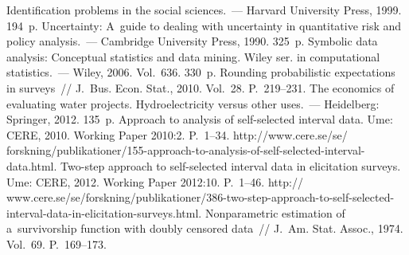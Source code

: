 


\vspace*{-6pt}


 \begin{multicols}{2}

\renewcommand{\bibname}{\protect\rmfamily Литература}

{\small\frenchspacing
{%
\begin{thebibliography}{99}

{Identification problems in the social sciences.}~--- Harvard University
Press, 1999. 194~p.
{Uncertainty: A~guide to dealing with uncertainty in
quantitative risk and policy analysis}.~--- Cambridge University Press, 1990. 
 325~p.
{Symbolic data analysis: Conceptual statistics
and data mining}. Wiley ser. in computational statistics.~--- Wiley, 2006.  Vol.~636.
330~p.
Rounding probabilistic expectations in surveys~//
{J.~Bus. Econ. Stat.}, 2010. Vol.~28. P.~219--231.
{The economics of evaluating water projects.
Hydroelectricity versus other uses.}~--- Heidelberg: Springer, 2012.  135~p.
Approach to analysis of self-selected interval data.
\mbox{Ume}: CERE,  2010.
Working Paper 2010:2. P.~1--34. 
 {\sf  
http://www.cere.se/se/ forskning/publikationer/155-approach-to-analysis-of-self-selected-interval-data.html}.
Two-step approach to self-selected interval
data in elicitation surveys. 
\mbox{Ume}:
CERE, 2012. 
Working Paper 2012:10. P.~1--46.
{\sf  http:// www.cere.se/se/forskning/publikationer/386-two-step-approach-to-self-selected-interval-data-in-elicitation-surveys.html}.
Nonparametric estimation of a~survivorship function with doubly censored data~//
J.~Am. Stat. Assoc., 1974.  Vol.~69. P.~169--173.

\end{thebibliography}}}
\end{multicols}
